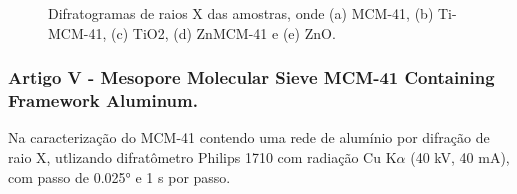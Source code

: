 \begin{figure}[ht]
    \center
    \begin{minipage}{12cm}
     \caption{Difratogramas de raios X das amostras, onde (a) MCM-41, (b) Ti-MCM-41, (c) TiO2, (d) ZnMCM-41 e (e) ZnO.
     }\label{figureDRXDaronch2019} 
     \end{minipage}
\end{figure}

\subsubsection*{\textbf{Artigo V} - Mesopore Molecular Sieve MCM-41 Containing Framework Aluminum.}

Na caracterização do MCM-41 contendo uma rede de alumínio por difração de raio X, 
utlizando difratômetro Philips 1710 com radiação Cu K$\alpha$ (40 kV, 40 mA), com passo de
0.025° e 1 s por passo. 


